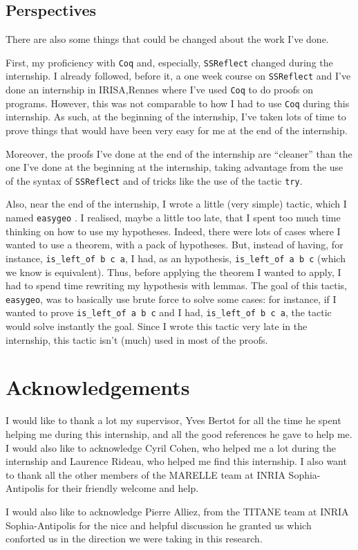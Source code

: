 \documentclass[a4paper,10pt]{article}
\begin{document}
\subsection{Perspectives}

There are also some things that could be changed about the work I've done.

First, my proficiency with {\tt Coq} and, especially, {\tt SSReflect} changed during the internship. I already followed, before it, a one week course on {\tt SSReflect} and I've done an internship in IRISA,Rennes where I've used {\tt Coq} to do proofs on programs. However, this was not comparable to how I had to use {\tt Coq} during this internship. As such, at the beginning of the internship, I've taken lots of time to prove things that would have been very easy for me at the end of the internship.

  Moreover, the proofs I've done at the end of the internship are ``cleaner'' than the one I've done at the beginning at the internship, taking advantage from the use of the syntax of {\tt SSReflect} and of tricks like the use of the tactic {\tt try}.

  Also, near the end of the internship, I wrote a little (very simple) tactic, which I named {\tt easygeo} \label{easygeo}. I realised, maybe a little too late, that I spent too much time thinking on how to use my hypotheses. Indeed, there were lots of cases where I wanted to use a theorem, with a pack of hypotheses. But, instead of having, for instance, {\tt is\_left\_of b c a}, I had, as an hypothesis, {\tt is\_left\_of a b c} (which we know is equivalent). Thus, before applying the theorem I wanted to apply, I had to spend time rewriting my hypothesis with lemmas. The goal of this tactis, {\tt easygeo}, was to basically use brute force to solve some cases: for instance, if I wanted to prove {\tt is\_left\_of a b c} and I had, {\tt is\_left\_of b c a}, the tactic would solve instantly the goal. Since I wrote this tactic very late in the internship, this tactic isn't (much) used in most of the proofs.

\section{Acknowledgements}
I would like to thank a lot my supervisor, Yves Bertot for all the time he spent helping me during this internship, and all the good references he gave to help me. I would also like to acknowledge Cyril Cohen, who helped me a lot during the internship and Laurence Rideau, who helped me find this internship. I also want to thank all the other members of the MARELLE team at INRIA Sophia-Antipolis for their friendly welcome and help.

I would also like to acknowledge Pierre Alliez, from the TITANE team at INRIA Sophia-Antipolis for the nice and helpful discussion he granted us which conforted us in the direction we were taking in this research.

\newpage


\end{document}
